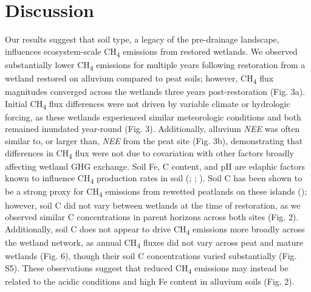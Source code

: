 \documentclass[
  12pt,
]{article}
\begin{document}
\section{Discussion}\label{discussion}

Our results suggest that soil type, a legacy of the pre-drainage
landscape, influences ecosystem-scale CH\textsubscript{4} emissions from
restored wetlands. We observed substantially lower CH\textsubscript{4}
emissions for multiple years following restoration from a wetland
restored on alluvium compared to peat soils; however,
CH\textsubscript{4} flux magnitudes converged across the wetlands three
years post-restoration (Fig. 3a). Initial CH\textsubscript{4} flux
differences were not driven by variable climate or hydrologic forcing,
as these wetlands experienced similar meteorologic conditions and both
remained inundated year-round (Fig. 3). Additionally, alluvium
\emph{NEE} was often similar to, or larger than, \emph{NEE} from the
peat site (Fig. 3b), demonstrating that differences in
CH\textsubscript{4} flux were not due to covariation with other factors
broadly affecting wetland GHG exchange. Soil Fe, C content, and pH are
edaphic factors known to influence CH\textsubscript{4} production rates
in soil (;
;
).
Soil C has been shown to be a strong proxy for CH\textsubscript{4}
emissions from rewetted peatlands on these islands
(); however, soil C
did not vary between wetlands at the time of restoration, as we observed
similar C concentrations in parent horizons across both sites (Fig. 2).
Additionally, soil C does not appear to drive CH\textsubscript{4}
emissions more broadly across the wetland network, as annual
CH\textsubscript{4} fluxes did not vary across peat and mature wetlands
(Fig. 6), though their soil C concentrations varied substantially (Fig.
S5). These observations suggest that reduced CH\textsubscript{4}
emissions may instead be related to the acidic conditions and high Fe
content in alluvium soils (Fig. 2).
\end{document}
